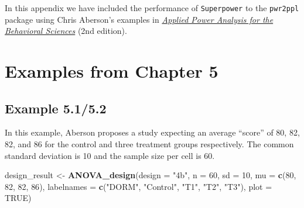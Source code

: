 \documentclass[
]{book}
\newenvironment{Shaded}{\begin{snugshade}}{\end{snugshade}}
\newcommand{\DataTypeTok}[1]{\textcolor[rgb]{0.13,0.29,0.53}{#1}}
\newcommand{\DecValTok}[1]{\textcolor[rgb]{0.00,0.00,0.81}{#1}}
\newcommand{\KeywordTok}[1]{\textcolor[rgb]{0.13,0.29,0.53}{\textbf{#1}}}
\newcommand{\NormalTok}[1]{#1}
\newcommand{\OtherTok}[1]{\textcolor[rgb]{0.56,0.35,0.01}{#1}}
\newcommand{\StringTok}[1]{\textcolor[rgb]{0.31,0.60,0.02}{#1}}
\begin{document}
In this appendix we have included the performance of \texttt{Superpower} to the \texttt{pwr2ppl} package using Chris Aberson's examples in \href{https://www.crcpress.com/Applied-Power-Analysis-for-the-Behavioral-Sciences-2nd-Edition/Aberson/p/book/9781138044593}{\emph{Applied Power Analysis for the Behavioral Sciences}} (2nd edition).

\hypertarget{examples-from-chapter-5}{%
\section{Examples from Chapter 5}\label{examples-from-chapter-5}}

\hypertarget{example-5.15.2}{%
\subsection{Example 5.1/5.2}\label{example-5.15.2}}

In this example, Aberson proposes a study expecting an average ``score'' of 80, 82, 82, and 86 for the control and three treatment groups respectively. The common standard deviation is 10 and the sample size per cell is 60.

\begin{Shaded}
\begin{Highlighting}[]
\NormalTok{design_result <-}\StringTok{ }\KeywordTok{ANOVA_design}\NormalTok{(}\DataTypeTok{design =} \StringTok{"4b"}\NormalTok{,}
                              \DataTypeTok{n =} \DecValTok{60}\NormalTok{,}
                              \DataTypeTok{sd =} \DecValTok{10}\NormalTok{,}
                              \DataTypeTok{mu =} \KeywordTok{c}\NormalTok{(}\DecValTok{80}\NormalTok{, }\DecValTok{82}\NormalTok{, }\DecValTok{82}\NormalTok{, }\DecValTok{86}\NormalTok{),}
                              \DataTypeTok{labelnames =} \KeywordTok{c}\NormalTok{(}\StringTok{"DORM"}\NormalTok{,}
                              \StringTok{"Control"}\NormalTok{,}
                              \StringTok{"T1"}\NormalTok{,}
                              \StringTok{"T2"}\NormalTok{,}
                              \StringTok{"T3"}\NormalTok{),}
                              \DataTypeTok{plot =} \OtherTok{TRUE}\NormalTok{)}
\end{Highlighting}
\end{Shaded}
\end{document}
